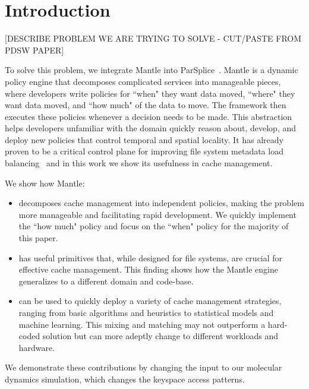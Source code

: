 \section{Introduction}

[DESCRIBE PROBLEM WE ARE TRYING TO SOLVE - CUT/PASTE FROM PDSW PAPER]

To solve this problem, we integrate Mantle into
ParSplice~\cite{perez:jctc20150parsplice}. Mantle is a dynamic policy engine
that decomposes complicated services into manageable pieces, where developers
write policies for ``when" they want data moved, ``where" they want data moved,
and ``how much" of the data to move.  The framework then executes these
policies whenever a decision needs to be made.  This abstraction helps
developers unfamiliar with the domain quickly reason about, develop, and deploy
new policies that control temporal and spatial locality. It has already proven
to be a critical control plane for improving file system metadata load
balancing~\cite{sevilla:sc15-mantle} and in this work we show its usefulness in
cache management.

We show how Mantle:
\begin{itemize}

  \item decomposes cache management into independent policies, making the
  problem more manageable and facilitating rapid development. We quickly implement
  the ``how much" policy and focus on the ``when" policy for the majority of this paper.

  \item has useful primitives that, while designed for file systems, are
  crucial for effective cache management. This finding shows how the Mantle
  engine generalizes to a different domain and code-base.

  \item can be used to quickly deploy a variety of cache management strategies,
  ranging from basic algorithms and heuristics to statistical models and machine
  learning. This mixing and matching may not outperform a hard-coded solution but
  can more adeptly change to different workloads and hardware. 

\end{itemize}

We demonstrate these contributions by changing the input to our molecular
dynamics simulation, which changes the keyspace access patterns. 



